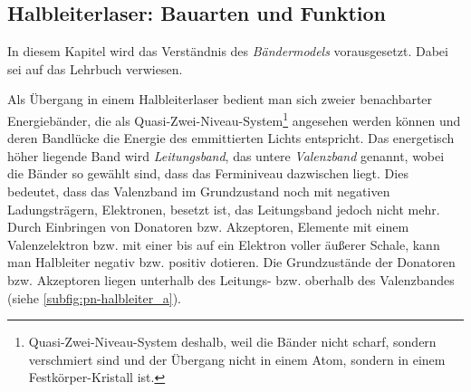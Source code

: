 \subsection{Halbleiterlaser: Bauarten und
Funktion}\label{subsec:halbleiterlaser}
In diesem Kapitel wird das Verständnis des \textit{Bändermodels} vorausgesetzt.
Dabei sei auf das Lehrbuch \cite{demtroeder:ex3} verwiesen.\par
Als Übergang in
einem Halbleiterlaser bedient man sich zweier benachbarter Energiebänder, die
als Quasi-Zwei-Niveau-System\footnote{Quasi-Zwei-Niveau-System deshalb, weil
die Bänder nicht scharf, sondern verschmiert sind und der Übergang nicht
in einem Atom, sondern in einem Festkörper-Kristall ist.} angesehen werden
können und deren Bandlücke die Energie des emmittierten Lichts entspricht.
Das energetisch höher liegende Band wird \textit{Leitungsband}, das untere
\textit{Valenzband} genannt, wobei die Bänder so gewählt sind, dass das
Ferminiveau dazwischen liegt. Dies bedeutet, dass das Valenzband im Grundzustand
noch mit negativen Ladungsträgern, Elektronen, besetzt ist, das Leitungsband
jedoch nicht mehr. Durch Einbringen von Donatoren bzw.
Akzeptoren, Elemente mit einem Valenzelektron bzw. mit einer bis auf ein
Elektron voller äußerer Schale, kann man Halbleiter negativ bzw. positiv
dotieren. Die Grundzustände der Donatoren bzw. Akzeptoren liegen unterhalb des
Leitungs- bzw. oberhalb des Valenzbandes (siehe \ref{subfig:pn-halbleiter_a}).
